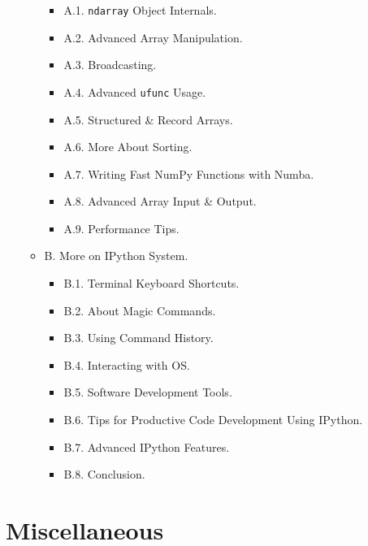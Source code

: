 \documentclass{article}
\begin{document}
\begin{enumerate}
\begin{itemize}
		\begin{itemize}
			\item {\sf A.1. {\tt ndarray} Object Internals.}
			\item {\sf A.2. Advanced Array Manipulation.}
			\item {\sf A.3. Broadcasting.}
			\item {\sf A.4. Advanced {\tt ufunc} Usage.}
			\item {\sf A.5. Structured \& Record Arrays.}
			\item {\sf A.6. More About Sorting.}
			\item {\sf A.7. Writing Fast NumPy Functions with Numba.}
			\item {\sf A.8. Advanced Array Input \& Output.}
			\item {\sf A.9. Performance Tips.}
		\end{itemize}
		\item {\sf B. More on IPython System.}
		\begin{itemize}
			\item {\sf B.1. Terminal Keyboard Shortcuts.}
			\item {\sf B.2. About Magic Commands.}
			\item {\sf B.3. Using Command History.}
			\item {\sf B.4. Interacting with OS.}
			\item {\sf B.5. Software Development Tools.}
			\item {\sf B.6. Tips for Productive Code Development Using IPython.}
			\item {\sf B.7. Advanced IPython Features.}
			\item {\sf B.8. Conclusion.}
		\end{itemize}
	\end{itemize}	
\end{enumerate}


\section{Miscellaneous}


\printbibliography[heading=bibintoc]
	
\end{document}
